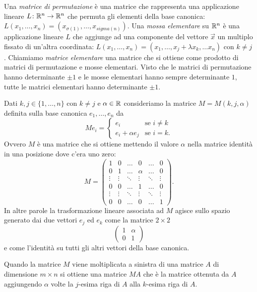 Una \emph{matrice di permutazione} è una matrice che rappresenta 
una applicazione lineare $L\colon {\mathbb R}^n\to {\mathbb R}^n$ che permuta 
gli elementi della base canonica: 
$L (x_1,\dots,x_n) = (x_{\sigma(1)},\dots,x_{sigma(n)})$.
Una \emph{mossa elementare} su ${\mathbb R}^n$ 
è una applicazione lineare $L$ che aggiunge ad una componente del vettore 
$\vec x$ un multiplo fissato di un'altra coordinata:
$L(x_1,\dots, x_n) = (x_1, \dots, x_j + \lambda x_k, \dots x_n)$
con $k\neq j$.
Chiamiamo \emph{matrice elementare} una matrice che si ottiene 
come prodotto di matrici di permutazione e mosse elementari.
Visto che le matrici di permutazione hanno determinante $\pm 1$
e le mosse elementari hanno sempre determinante $1$, 
tutte le matrici elementari hanno determinante $\pm 1$.

\begin{definition}
Dati $k,j\in \{1,\ldots,n\}$ con $k\neq j$ e $\alpha \in {\mathbb R}$
consideriamo la matrice $M=M(k,j,\alpha)$ 
definita sulla base canonica $e_1,\dots, e_n$ da 
\[
   M e_i = \begin{cases}
      e_i & \text{se $i\neq k$}\\
      e_i + \alpha e_j & \text{se $i=k$}.
   \end{cases}
\]
Ovvero $M$ è una matrice che si ottiene mettendo il valore $\alpha$
nella matrice identità in una posizione dove c'era uno zero:
\[
   M = \begin{pmatrix}
    1 & 0 & \dots & 0 & \dots & 0\\
    0 & 1 & \dots & \alpha & \dots & 0\\
    \vdots & \vdots & \ddots & \vdots & \ddots & \vdots\\
    0 & 0 & \dots & 1 & \dots & 0\\
    \vdots & \vdots & \ddots & \vdots & \ddots & \vdots\\
    0 & 0 & \dots & 0 & \dots & 1
   \end{pmatrix}.
\]
In altre parole la trasformazione lineare associata ad $M$ 
agisce sullo spazio generato dai due vettori $e_j$ ed $e_k$
come la matrice $2\times 2$
\[
  \begin{pmatrix}
    1 & \alpha\\
    0 & 1
  \end{pmatrix}
\]
e come l'identità su tutti gli altri vettori della base canonica.

Quando la matrice $M$ viene moltiplicata a sinistra 
di una matrice $A$ di dimensione $m\times n$
si ottiene una matrice $M A$ che è la matrice ottenuta da $A$
aggiungendo $\alpha$ volte la $j$-esima riga di $A$
alla $k$-esima riga di $A$.


\end{definition}
